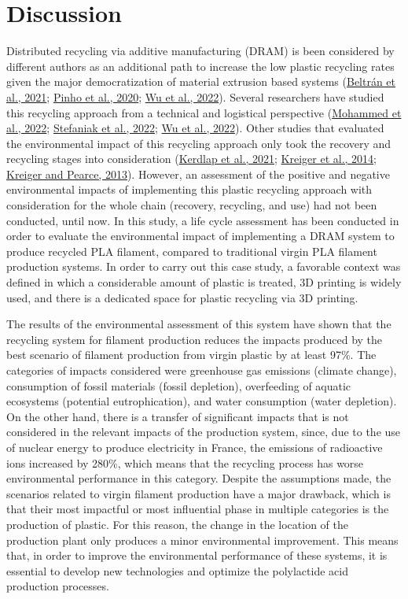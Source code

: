 \documentclass[12pt]{elsarticle} %
\begin{document}
\hypertarget{Discussion}{%
\section{Discussion}\label{Discussion}}

Distributed recycling via additive manufacturing (DRAM) is been considered by different authors as an additional path to increase the low plastic recycling rates given the major democratization of material extrusion based systems (\protect\hyperlink{ref-Beltran2021}{Beltrán et al., 2021}; \protect\hyperlink{ref-Pinho2020}{Pinho et al., 2020}; \protect\hyperlink{ref-Wu2021a}{Wu et al., 2022}).
Several researchers have studied this recycling approach from a technical and logistical perspective (\protect\hyperlink{ref-Mohammed2022}{Mohammed et al., 2022}; \protect\hyperlink{ref-Stefaniak2022}{Stefaniak et al., 2022}; \protect\hyperlink{ref-Wu2021a}{Wu et al., 2022}).
Other studies that evaluated the environmental impact of this recycling approach only took the recovery and recycling stages into consideration (\protect\hyperlink{ref-Kerdlap2021}{Kerdlap et al., 2021}; \protect\hyperlink{ref-Kreiger2014}{Kreiger et al., 2014}; \protect\hyperlink{ref-Kreiger2013}{Kreiger and Pearce, 2013}).
However, an assessment of the positive and negative environmental impacts of implementing this plastic recycling approach with consideration for the whole chain (recovery, recycling, and use) had not been conducted, until now.
In this study, a life cycle assessment has been conducted in order to evaluate the environmental impact of implementing a DRAM system to produce recycled PLA filament, compared to traditional virgin PLA filament production systems.
In order to carry out this case study, a favorable context was defined in which a considerable amount of plastic is treated, 3D printing is widely used, and there is a dedicated space for plastic recycling via 3D printing.

The results of the environmental assessment of this system have shown that the recycling system for filament production reduces the impacts produced by the best scenario of filament production from virgin plastic by at least 97\%.
The categories of impacts considered were greenhouse gas emissions (climate change), consumption of fossil materials (fossil depletion), overfeeding of aquatic ecosystems (potential eutrophication), and water consumption (water depletion).
On the other hand, there is a transfer of significant impacts that is not considered in the relevant impacts of the production system, since, due to the use of nuclear energy to produce electricity in France, the emissions of radioactive ions increased by 280\%, which means that the recycling process has worse environmental performance in this category.
Despite the assumptions made, the scenarios related to virgin filament production have a major drawback, which is that their most impactful or most influential phase in multiple categories is the production of plastic.
For this reason, the change in the location of the production plant only produces a minor environmental improvement.
This means that, in order to improve the environmental performance of these systems, it is essential to develop new technologies and optimize the polylactide acid production processes.
\end{document}
